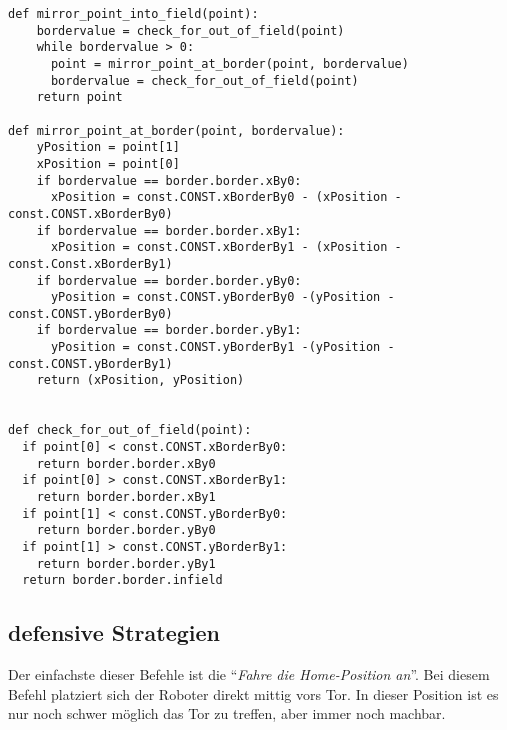 \begin{lstlisting}[caption= Python-Funktion für Punktspiegelung, label=lst:Punktspiegelung]
def mirror_point_into_field(point):
    bordervalue = check_for_out_of_field(point)
    while bordervalue > 0:
	  point = mirror_point_at_border(point, bordervalue)
	  bordervalue = check_for_out_of_field(point)
    return point
   
def mirror_point_at_border(point, bordervalue):
    yPosition = point[1] 
    xPosition = point[0]
    if bordervalue == border.border.xBy0:
      xPosition = const.CONST.xBorderBy0 - (xPosition - const.CONST.xBorderBy0)
    if bordervalue == border.border.xBy1:
	  xPosition = const.CONST.xBorderBy1 - (xPosition - const.Const.xBorderBy1)
    if bordervalue == border.border.yBy0:
      yPosition = const.CONST.yBorderBy0 -(yPosition - const.CONST.yBorderBy0)
    if bordervalue == border.border.yBy1:
      yPosition = const.CONST.yBorderBy1 -(yPosition - const.CONST.yBorderBy1)
    return (xPosition, yPosition)
   
   
def check_for_out_of_field(point):
  if point[0] < const.CONST.xBorderBy0:
    return border.border.xBy0
  if point[0] > const.CONST.xBorderBy1:
    return border.border.xBy1
  if point[1] < const.CONST.yBorderBy0:
    return border.border.yBy0
  if point[1] > const.CONST.yBorderBy1:
    return border.border.yBy1
  return border.border.infield 
\end{lstlisting}



\subsection{defensive Strategien}
Der einfachste dieser Befehle ist die \enquote{\textit{Fahre die Home-Position an}}. Bei diesem Befehl platziert sich der Roboter direkt mittig vors Tor. In dieser Position ist es nur noch schwer möglich das Tor zu treffen, aber immer noch machbar. 

